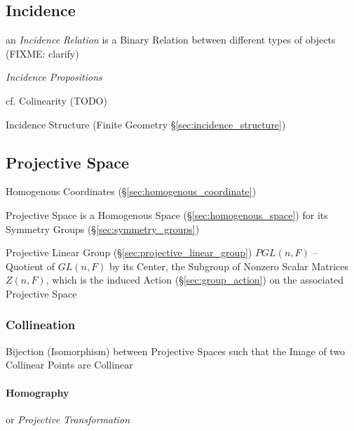 \subsection{Incidence}\label{sec:incidence}


an \emph{Incidence Relation} is a Binary Relation between different types of
objects (FIXME: clarify)

\emph{Incidence Propositions}

\fist cf. Colinearity (TODO)

\fist Incidence Structure (Finite Geometry \S\ref{sec:incidence_structure})



\subsection{Projective Space}\label{sec:projective_space}

Homogenous Coordinates (\S\ref{sec:homogenous_coordinate})

Projective Space is a Homogenous Space (\S\ref{sec:homogenous_space}) for its
Symmetry Groups (\S\ref{sec:symmetry_groups})

Projective Linear Group (\S\ref{sec:projective_linear_group}) $PGL(n,F)$ --
Quotient of $GL(n,F)$ by its Center, the Subgroup of Nonzero Scalar Matrices
$Z(n,F)$, which is the induced Action (\S\ref{sec:group_action}) on the
associated Projective Space



\subsubsection{Collineation}\label{sec:collineation}

Bijection (Isomorphism) between Projective Spaces such that the Image of two
Collinear Points are Collinear



\paragraph{Homography}\label{sec:homography}\hfill

or \emph{Projective Transformation}

